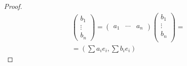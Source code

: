 \begin{conseq}
\begin{enumerate}
\begin{proof}
\begin{gather*}
				\begin{pmatrix} b_1 \\ \vdots \\ b_n \end{pmatrix}
			=
				\begin{pmatrix} a_1 & \cdots & a_n \end{pmatrix}
				\begin{pmatrix} b_1 \\ \vdots \\ b_n \\ \end{pmatrix} = \\
			= \left(\sum a_i e_i, \sum b_i e_i \right)
		\end{gather*}
	\end{proof}
	\end{enumerate}
\end{conseq}

